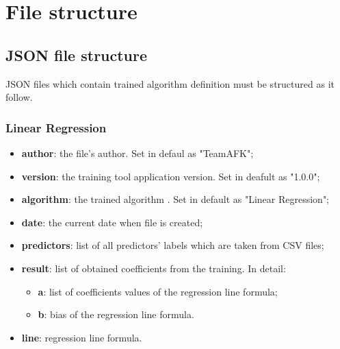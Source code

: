 \section{File structure}
	\subsection{JSON file structure}
JSON files which contain trained algorithm definition must be structured as it follow.	

		\subsubsection{Linear Regression}
		\begin{itemize}
			\item\textbf{author}: the file's author. Set in defaul as "TeamAFK";
			\item\textbf{version}: the training tool application version. Set in deafult as "1.0.0";
			\item\textbf{algorithm}: the trained algorithm . Set in default as "Linear Regression"; 	
			\item\textbf{date}: the current date when file is created;
			\item\textbf{predictors}: list of all predictors' labels which are taken from CSV files;
			\item\textbf{result}: list of obtained coefficients from the training. In detail:
			\begin{itemize}
					\item\textbf{a}: list of coefficients values of the regression line formula;
					\item\textbf{b}: bias of the regression line formula. 
				\end{itemize}
			\item\textbf{line}: regression line formula.
					
		\end{itemize}
		
